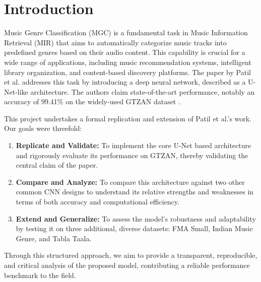 \documentclass[11pt,a4paper]{article}
\begin{document}



\section{Introduction}
\label{sec:introduction}
Music Genre Classification (MGC) is a fundamental task in Music Information Retrieval (MIR) that aims to automatically categorize music tracks into predefined genres based on their audio content. This capability is crucial for a wide range of applications, including music recommendation systems, intelligent library organization, and content-based discovery platforms. The paper by Patil et al. \cite{patil} addresses this task by introducing a deep neural network, described as a U-Net-like architecture. The authors claim state-of-the-art performance, notably an accuracy of 99.41\% on the widely-used GTZAN dataset \textbf{\cite{tzanetakis2002gtzan}}. %

This project undertakes a formal replication and extension of Patil et al.'s work. Our goals were threefold:
\begin{enumerate}
    \item \textbf{Replicate and Validate:} To implement the core U-Net based architecture and rigorously evaluate its performance on GTZAN, thereby validating the central claim of the paper.
    \item \textbf{Compare and Analyze:} To compare this architecture against two other common CNN designs to understand its relative strengths and weaknesses in terms of both accuracy and computational efficiency.
    \item \textbf{Extend and Generalize:} To assess the model's robustness and adaptability by testing it on three additional, diverse datasets: FMA Small, Indian Music Genre, and Tabla Taala.
\end{enumerate}
Through this structured approach, we aim to provide a transparent, reproducible, and critical analysis of the proposed model, contributing a reliable performance benchmark to the field.
\end{document}
